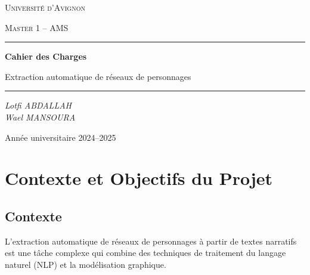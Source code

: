 \documentclass[12pt,a4paper]{article}
\begin{document}
\begin{titlepage}
    \centering
    \vspace*{2cm}
    
    {\scshape\LARGE Université d'Avignon \par}
    \vspace{0.5cm}
    {\scshape\Large Master 1 -- AMS \par}
    \vspace{2cm}
    
    \rule{\textwidth}{1.5pt}\par
    \vspace{0.8cm}
    {\Huge\bfseries Cahier des Charges\par}
    \vspace{0.5cm}
    {\LARGE Extraction automatique de réseaux de personnages\par}
    \vspace{0.8cm}
    \rule{\textwidth}{1.5pt}\par
    
    \vspace{2cm}
    
    {\Large\itshape Lotfi ABDALLAH \\ Wael MANSOURA\par}
    
    \vfill
    
    {\large Année universitaire 2024--2025\par}
\end{titlepage}

\tableofcontents
\newpage

\section{Contexte et Objectifs du Projet}

\subsection{Contexte}

L'extraction automatique de réseaux de personnages à partir de textes narratifs est une tâche complexe qui combine des techniques de traitement du langage naturel (NLP) et la modélisation graphique.
\end{document}
